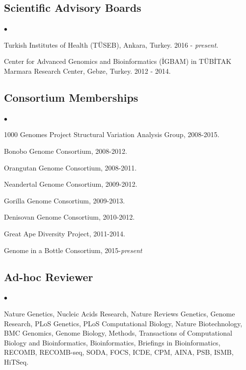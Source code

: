 \documentclass[margin,line]{res}
\newenvironment{list2}{
  \begin{list}{$\bullet$}{%
      \setlength{\itemsep}{0in}
      \setlength{\parsep}{0in} \setlength{\parskip}{0in}
      \setlength{\topsep}{0in} \setlength{\partopsep}{0in} 
      \setlength{\leftmargin}{0.2in}}}{\end{list}}
\begin{document}
\begin{resume}
\vspace{-0.6cm}
\subsection{\small \sc Scientific Advisory Boards}
\begin{list2}
\item
  Turkish Institutes of Health (TÜSEB), Ankara, Turkey. 2016 - {\it present}.
\item
  Center for Advanced Genomics and Bioinformatics (\.{I}GBAM)
  in T\"{U}B\.{I}TAK Marmara Research Center, Gebze, Turkey. 2012 - 2014.
\end{list2}

\vspace{-0.6cm}
\subsection{\small \sc Consortium Memberships}

\begin{list2}
\item
  1000 Genomes Project Structural Variation Analysis Group, 2008-2015.
\item
  Bonobo Genome Consortium, 2008-2012.
\item
  Orangutan Genome Consortium, 2008-2011.
\item
  Neandertal Genome Consortium, 2009-2012.
\item
  Gorilla Genome Consortium, 2009-2013.
\item
  Denisovan Genome Consortium, 2010-2012.
\item
  Great Ape Diversity Project, 2011-2014.
\item
  Genome in a Bottle Consortium, 2015-{\it present}
\end{list2}


\vspace{-0.6cm}
\subsection{\small \sc Ad-hoc Reviewer}
\begin{list2}
\item
  Nature Genetics, Nucleic Acids Research, Nature Reviews Genetics, Genome Research, PLoS Genetics, PLoS Computational Biology, 
  Nature Biotechnology, BMC Genomics, Genome Biology, Methods, Transactions of Computational Biology and Bioinformatics,
  Bioinformatics, Briefings in Bioinformatics, RECOMB, RECOMB-seq, SODA, FOCS, ICDE, CPM, AINA, PSB, ISMB, HiTSeq.
\end{list2}


\end{resume}
\end{document}
